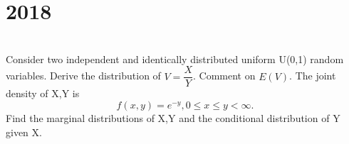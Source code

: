 \section*{2018}
\vspace{-.5cm}
\hrulefill \smallskip\\
 Consider two independent and identically distributed uniform U(0,1) random variables. Derive the distribution of $V = \dfrac{X}{Y}$. Comment on $E(V)$.
\myline
{} The joint density of X,Y is \[f(x,y) = e^{-y}, 0 \leq x\leq y<\infty. \] Find the marginal distributions of X,Y and the conditional distribution of Y given X.
\myline


